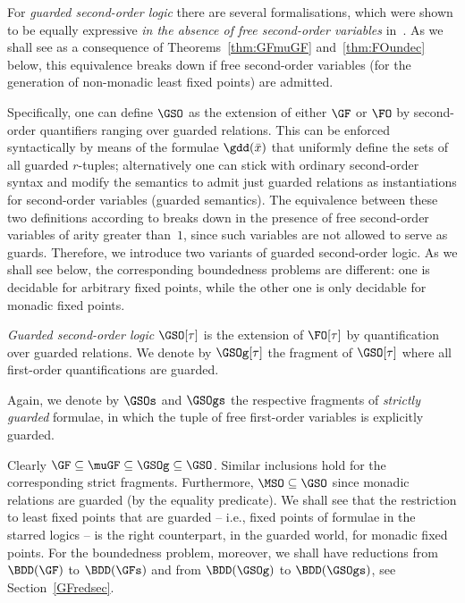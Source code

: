 \documentclass{LMCS}
\begin{document}
\smallskip
For \emph{guarded second-order logic} there are several formalisations,
which were shown to be equally expressive \emph{in the absence of free
second-order variables} in~\cite{GHO}.
As we shall see 
as a consequence of Theorems~\ref{thm:GFmuGF} and~\ref{thm:FOundec}
below, this equivalence breaks down
if free second-order variables (for the generation
of non-monadic least fixed points) are admitted.

Specifically, one can define $\GSO$ as the extension of either $\GF$
or $\FO$ by second-order quantifiers ranging over guarded relations.
This can be enforced syntactically by means
of the formulae $\gdd(\bar x)$ that uniformly
define the sets of all guarded $r$-tuples\?;
alternatively one can stick with ordinary
second-order syntax and modify the semantics
to admit just guarded relations as instantiations for
second-order variables (guarded semantics).
The equivalence between these two definitions according to
\cite{GHO} breaks down in the presence of free
second-order variables of arity greater than~$1$,
since such variables are not allowed to serve as guards.
Therefore, we introduce two variants of guarded second-order logic.
As we shall see below, the corresponding boundedness problems
are different\?: one is decidable for arbitrary fixed points,
while the other one is only decidable for monadic fixed points.

\begin{defi}
\emph{Guarded second-order logic} $\GSO[\tau]$ is the extension
of $\FO[\tau]$ by quantification over guarded relations.
We denote by $\GSOg[\tau]$ the fragment of $\GSO[\tau]$
where all first-order quantifications are guarded.

Again, we denote by $\GSOs$ and $\GSOgs$ the respective
fragments of \emph{strictly guarded} formulae,
in which the tuple of free first-order variables
is explicitly guarded.
\end{defi}

Clearly $\GF \subseteq \muGF \subseteq \GSOg \subseteq \GSO$.
Similar inclusions hold for the corresponding strict fragments.
Furthermore, $\MSO \subseteq \GSO$
since monadic relations are guarded (by the equality predicate).
We shall see that
the restriction to least fixed points that are guarded --
i.e., fixed points of formulae in the starred logics --
is the right counterpart, in the guarded world, for
monadic fixed points.
For the boundedness problem, moreover, we shall have
reductions from $\BDD(\GF)$ to $\BDD(\GFs)$ and
from $\BDD(\GSOg)$ to $\BDD(\GSOgs)$, see Section~\ref{GFredsec}.
\end{document}
